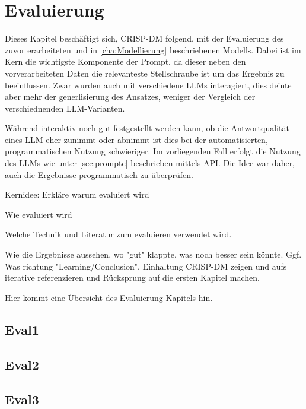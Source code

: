 
\chapter{Evaluierung}
\label{cha:eval}

Dieses Kapitel beschäftigt sich, \ac{CRISP-DM} folgend, mit der Evaluierung des zuvor erarbeiteten und in \autoref{cha:Modellierung} beschriebenen Modells. Dabei ist im Kern die wichtigste Komponente der Prompt, da dieser neben den vorverarbeiteten Daten die relevanteste Stellschraube ist um das Ergebnis zu beeinflussen. Zwar wurden auch mit verschiedene LLMs interagiert, dies deinte aber mehr der generlisierung des Ansatzes, weniger der Vergleich der verschiednenden \ac{LLM}-Varianten.

Während interaktiv noch gut festgestellt werden kann, ob die Antwortqualität eines \ac{LLM} eher zunimmt oder abnimmt ist dies bei der automatisierten, programmatischen Nutzung schwieriger. Im vorliegenden Fall erfolgt die Nutzung des \ac{LLM}s wie unter \autoref{sec:prompte} beschrieben mittels \ac{API}. Die Idee war daher, auch die Ergebnisse programmatisch zu überprüfen.



Kernidee: Erkläre warum evaluiert wird

Wie evaluiert wird

Welche Technik und Literatur zum evaluieren verwendet wird.

Wie die Ergebnisse aussehen, wo "gut" klappte, was noch besser sein könnte. Ggf. Was richtung "Learning/Conclusion". Einhaltung CRISP-DM zeigen und aufs iterative referenzieren und Rücksprung auf die ersten Kapitel machen.

Hier kommt eine Übersicht des Evaluierung Kapitels hin.

\section{Eval1}
\label{sec:abschnitt3.1}

\section{Eval2}

\section{Eval3}